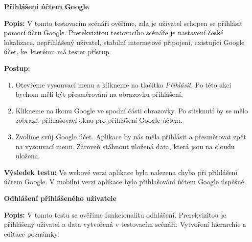 \documentclass[czech, bc, kiv, he, iso690numb]{fasthesis}
\begin{document}
\vspace{0.1cm}


\noindent \textbf{Přihlášení účtem Google}

\vspace{0.1cm}

\noindent \textbf{Popis:} V tomto testovacím scénáři ověříme, zda je uživatel schopen se přihlásit pomocí účtu Google. Prerekvizitou testovacího scénáře je nastavení české lokalizace, nepřihlášený uživatel, stabilní internetové připojení, existující Google účet, ke~kterému má tester přístup.

\vspace{0.1cm}

\noindent \textbf{Postup:}

\begin{enumerate}[label=\arabic*., itemsep=0pt, topsep=0pt, parsep=0pt]
    \item Otevřeme vysouvací menu a klikneme na tlačítko \textit{Přihlásit}. Po této akci bychom měli být přesměrováni na obrazovku přihlášení.
    \item Klikneme na ikonu Google ve spodní části obrazovky. Po stisknutí by se mělo zobrazit přihlašovací okno pro přihlášení Google účtem.
    \item Zvolíme svůj Google účet. Aplikace by nás měla přihlásit a přesměrovat zpět na vysouvací menu. Zároveň stáhnout uložená data, která jsou na cloudu uložena.
\end{enumerate}

\noindent \textbf{Výsledek testu:} Ve webové verzi aplikace byla nalezena chyba při přihlášení účtem Google. V mobilní verzi aplikace bylo přihlašování účtem Google úspěšné.

\newpage


\noindent \textbf{Odhlášení přihlášeného uživatele}

\vspace{0.1cm}

\noindent \textbf{Popis:} V tomto testu se ověříme funkcionalitu odhlášení. Prerekvizitou je přihlášený uživatel a data vytvořená v testovacím scénáři: Vytvoření hierarchie a editace poznámky. 

\vspace{0.1cm}
\end{document}
